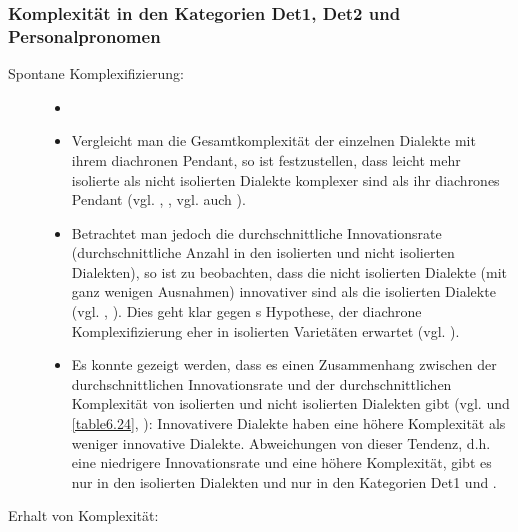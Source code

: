 \subsubsection{Komplexität in den Kategorien Det1, Det2 und Personalpronomen}

\begin{description}
 \item[Spontane Komplexifizierung:]
\begin{itemize}
\item[]
\item
Vergleicht man die Gesamtkomplexität der einzelnen Dialekte mit ihrem diachronen Pendant, so ist festzustellen, dass leicht mehr isolierte als nicht isolierten Dialekte komplexer sind als ihr diachrones Pendant (vgl. , , vgl. auch ).
\item
Betrachtet man jedoch die durchschnittliche Innovationsrate (durchschnittliche Anzahl  in den isolierten und nicht isolierten Dialekten), so ist zu beobachten, dass die nicht isolierten Dialekte (mit ganz wenigen Ausnahmen) innovativer sind als die isolierten Dialekte (vgl. , ). Dies geht klar gegen \citeauthor{Trudgill2011}s \citeyearpar{Trudgill2011} Hypothese, der diachrone Komplexifizierung eher in isolierten Varietäten erwartet (vgl. ).
\item
Es konnte gezeigt werden, dass es einen Zusammenhang zwischen der durchschnittlichen Innovationsrate und der durchschnittlichen Komplexität von isolierten und nicht isolierten Dialekten gibt (vgl.  und \ref{table6.24}, ): Innovativere Dialekte haben eine höhere Komplexität als weniger innovative Dialekte. Abweichungen von dieser Tendenz, d.h. eine niedrigere Innovationsrate und eine höhere Komplexität, gibt es nur in den isolierten Dialekten und nur in den Kategorien Det1 und .
\end{itemize}

\item[Erhalt von Komplexität:]


\end{description}
